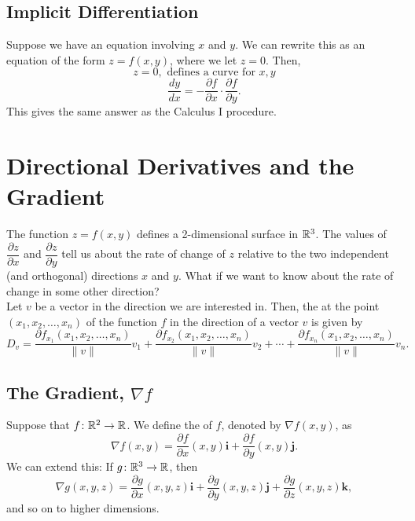 \subsection{Implicit Differentiation}

Suppose we have an equation involving \(x\) and \(y\). We can rewrite this as an equation of the form \(z = f(x, y)\), where we let \(z = 0\). Then,
\[
z = 0, \text{ defines a curve for } x, y
\]
\[
\dfrac{dy}{dx} = -\dfrac{\partial f}{\partial x} \cdot \dfrac{\partial f}{\partial y}.
\]
This gives the same answer as the Calculus I  procedure.    

\newpage

\section{Directional Derivatives and the Gradient}

The function \(z = f(x, y)\) defines a 2-dimensional surface in \(\mathbb{R}^{3}\). The values of \(\dfrac{\partial z}{\partial x}\) and \(\dfrac{\partial z}{\partial y}\) tell us about the rate of change of \(z\) relative to the two independent (and orthogonal) directions \(x\) and \(y\). What if we want to know about the rate of change in some other direction? \\

Let \(v\) be a vector in the direction we are interested in. Then, the  at the point \((x_{1}, x_{2}, \ldots, x_{n})\) of the function \(f\) in the direction of a vector \(v\) is given by
\[
D_{v} = \dfrac{\partial f_{x_{1}}(x_{1}, x_{2}, \ldots, x_{n})}{\|v\|}v_{1} + \dfrac{\partial f_{x_{2}}(x_{1}, x_{2}, \ldots, x_{n})}{\|v\|}v_{2} + \cdots + \dfrac{\partial f_{x_{n}}(x_{1}, x_{2}, \ldots, x_{n})}{\|v\|}v_{n}.
\]
\subsection{The Gradient, \(\nabla f\)}

Suppose that \(f \colon \mathbb{R}^{2} \to \mathbb{R}\). We define the  of \(f\), denoted by \(\nabla f(x, y)\), as
\[
\nabla f(x, y) = \dfrac{\partial f}{\partial x}(x, y)\mathbf{i} + \dfrac{\partial f}{\partial y}(x, y)\mathbf{j}.
\]
We can extend this: If \(g \colon \mathbb{R}^{3} \to \mathbb{R}\), then
\[
\nabla g(x, y, z) = \dfrac{\partial g}{\partial x}(x, y, z)\mathbf{i} + \dfrac{\partial g}{\partial y}(x, y, z)\mathbf{j} + \dfrac{\partial g}{\partial z}(x, y, z)\mathbf{k},
\]
and so on to higher dimensions. \\

